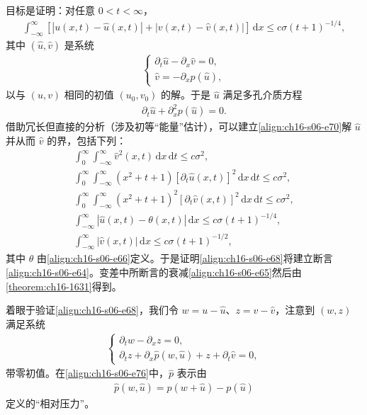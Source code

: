 \documentclass[../../main.tex]{subfiles}
\begin{document}
目标是证明：对任意 $0<t<\infty$，
\begin{align}
\int_{-\infty}^{\infty}[|u(x,t)-\hat u(x,t)|+|v(x,t)-\hat v(x,t)|]\,\mathrm{d}x\leqslant c\sigma(t+1)^{-1/4},
\label{align:ch16-s06-e68}
\end{align}
其中 $(\hat u,\hat v)$ 是系统
\begin{align}
\begin{cases}
\partial_t\hat u-\partial_x\hat v=0,\\
\hat v=-\partial_xp(\hat u),
\end{cases}
\label{align:ch16-s06-e69}
\end{align}
以与 $(u,v)$ 相同的初值 $(u_0,v_0)$ 的解。于是 $\hat u$ 满足多孔介质方程
\begin{align}
\partial_t\hat u+\partial_x^2p(\hat u)=0.
\label{align:ch16-s06-e70}
\end{align}
借助冗长但直接的分析（涉及初等“能量”估计），可以建立\eqref{align:ch16-s06-e70}解 $\hat u$ 并从而 $\hat v$ 的界，包括下列：
\begin{align}
\int_0^\infty\int_{-\infty}^{\infty}\hat v^2(x,t)\,\mathrm{d}x\,\mathrm{d}t\leqslant c\sigma^2,
\label{align:ch16-s06-e71}\\
\int_0^\infty\int_{-\infty}^{\infty}(x^2+t+1)[\partial_t\hat u(x,t)]^2\,\mathrm{d}x\,\mathrm{d}t\leqslant c\sigma^2,
\label{align:ch16-s06-e72}\\
\int_0^\infty\int_{-\infty}^{\infty}(x^2+t+1)^2[\partial_t\hat v(x,t)]^2\,\mathrm{d}x\,\mathrm{d}t\leqslant c\sigma^2,
\label{align:ch16-s06-e73}\\
\int_{-\infty}^{\infty}|\hat u(x,t)-\theta(x,t)|\,\mathrm{d}x\leqslant c\sigma(t+1)^{-1/4},
\label{align:ch16-s06-e74}\\
\int_{-\infty}^{\infty}|\hat v(x,t)|\,\mathrm{d}x\leqslant c\sigma(t+1)^{-1/2},
\label{align:ch16-s06-e75}
\end{align}
其中 $\theta$ 由\eqref{align:ch16-s06-e66}定义。于是证明\eqref{align:ch16-s06-e68}将建立断言\eqref{align:ch16-s06-e64}。变差中所断言的衰减\eqref{align:ch16-s06-e65}然后由\cref{theorem:ch16-1631}得到。

着眼于验证\eqref{align:ch16-s06-e68}，我们令 $w=u-\hat u$、$z=v-\hat v$，注意到 $(w,z)$ 满足系统
\begin{align}
\begin{cases}
\partial_tw-\partial_xz=0,\\
\partial_tz+\partial_x\hat p(w,\hat u)+z+\partial_t\hat v=0,
\end{cases}
\label{align:ch16-s06-e76}
\end{align}
带零初值。在\eqref{align:ch16-s06-e76}中，$\hat p$ 表示由
\begin{align}
\hat p(w,\hat u)=p(w+\hat u)-p(\hat u)
\label{align:ch16-s06-e77}
\end{align}
定义的“相对压力”。
\end{document}
